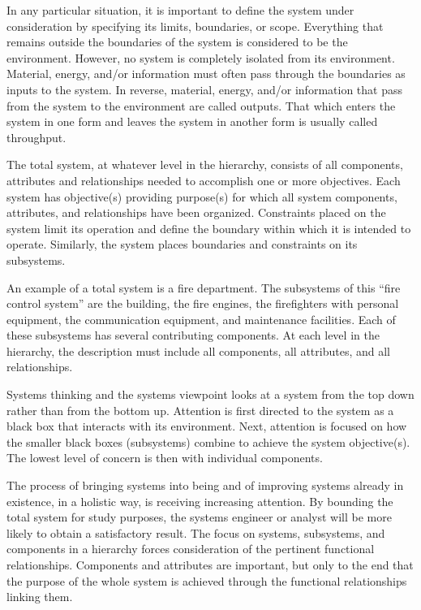 In any particular situation, it is important to define the system under consideration by specifying its limits, boundaries, or scope. Everything that remains outside the boundaries of the system is considered to be the environment. However, no system is completely isolated from its environment. Material, energy, and/or information must often pass through the boundaries as inputs to the system. In reverse, material, energy, and/or information that pass from the system to the environment are called outputs. That which enters the system in one form and leaves the system in another form is usually called throughput.

The total system, at whatever level in the hierarchy, consists of all components, attributes and relationships needed to accomplish one or more objectives. Each system has objective(s) providing purpose(s) for which all system components, attributes, and relationships have been organized. Constraints placed on the system limit its operation and define the boundary within which it is intended to operate. Similarly, the system places boundaries and constraints on its subsystems.

An example of a total system is a fire department. The subsystems of this “fire control system” are the building, the fire engines, the firefighters with personal equipment, the communication equipment, and maintenance facilities. Each of these subsystems has several contributing components. At each level in the hierarchy, the description must include all components, all attributes, and all relationships.

Systems thinking and the systems viewpoint looks at a system from the top down rather than from the bottom up. Attention is first directed to the system as a black box that interacts with its environment. Next, attention is focused on how the smaller black boxes (subsystems) combine to achieve the system objective(s). The lowest level of concern is then with individual components.

The process of bringing systems into being and of improving systems already in existence, in a holistic way, is receiving increasing attention. By bounding the total system for study purposes, the systems engineer or analyst will be more likely to obtain a satisfactory result. The focus on systems, subsystems, and components in a hierarchy forces consideration of the pertinent functional relationships. Components and attributes are important, but only to the end that the purpose of the whole system is achieved through the functional relationships linking them.

